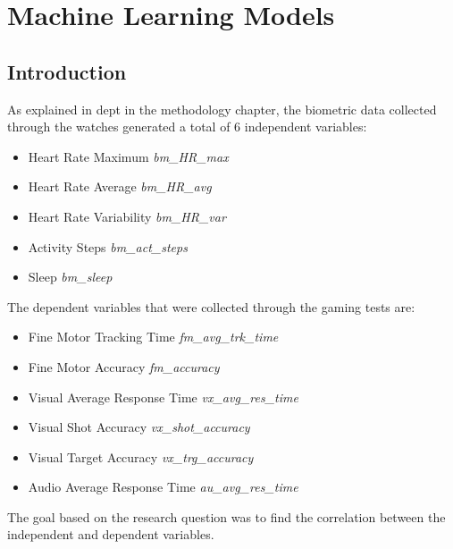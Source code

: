 \chapter{Machine Learning Models}

\section{Introduction}
As explained in dept in the methodology chapter, the biometric data collected through the watches generated a total of 6 independent variables:

\begin{itemize}
    \item Heart Rate Maximum \textit{bm\_HR\_max}
    \item Heart Rate Average \textit{bm\_HR\_avg}
    \item Heart Rate Variability \textit{bm\_HR\_var}
    \item Activity Steps \textit{bm\_act\_steps}
    \item Sleep \textit{bm\_sleep}
\end{itemize}

The dependent variables that were collected through the gaming tests are:

\begin{itemize}
    \item Fine Motor Tracking Time \textit{fm\_avg\_trk\_time}
    \item Fine Motor Accuracy \textit{fm\_accuracy}
    \item Visual Average Response Time \textit{vx\_avg\_res\_time}
    \item Visual Shot Accuracy \textit{vx\_shot\_accuracy}
    \item Visual Target Accuracy \textit{vx\_trg\_accuracy}
    \item Audio Average Response Time \textit{au\_avg\_res\_time}
\end{itemize}

The goal based on the research question was to find the correlation between the independent and dependent variables.

